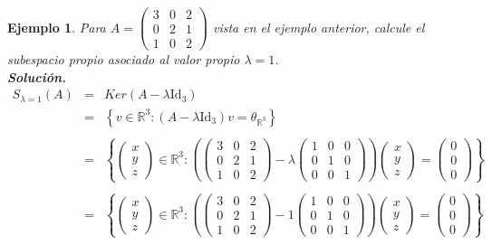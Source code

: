 \documentclass[12pt]{book}
\newtheorem{ejem}{Ejemplo}
\def\R{\mathbb{R}}
\begin{document}
\begin{ejem}
Para $A=\left(\begin{array}{ccc} 3 & 0 & 2 \\ 0 & 2 & 1 \\ 1 & 0 &2  \end{array}\right)$ vista en el ejemplo anterior, calcule el subespacio propio asociado al valor propio $\lambda=1$.\\

\textbf{Soluci\'on.}\\
{\em
\begin{eqnarray*}
S_{\lambda=1}(A)&=&Ker(A-\lambda\text{Id}_3)\\
&=&\left\{ v\in\R^3: (A- \lambda\text{Id}_3)v=\theta_{\R^3}\right\}\\
\\
&=&\left\{ \left(\begin{array}{c} x  \\ y \\ z  \end{array}\right)\in\R^3: \left(\left(\begin{array}{ccc} 3 & 0 & 2 \\ 0 & 2 & 1 \\ 1 & 0 &2  \end{array}\right) - \lambda\left(\begin{array}{ccc} 1 & 0 & 0 \\ 0 & 1 & 0 \\ 0 & 0 & 1 \end{array}\right)\right)\left(\begin{array}{c} x  \\ y \\ z  \end{array}\right)=\left(\begin{array}{c} 0 \\ 0 \\ 0  \end{array}\right)\right\}\\
\\
&=&\left\{ \left(\begin{array}{c} x  \\ y \\ z  \end{array}\right)\in\R^3: \left(\left(\begin{array}{ccc} 3 & 0 & 2 \\ 0 & 2 & 1 \\ 1 & 0 &2  \end{array}\right) - 1\left(\begin{array}{ccc} 1 & 0 & 0 \\ 0 & 1 & 0 \\ 0 & 0 & 1 \end{array}\right)\right)\left(\begin{array}{c} x  \\ y \\ z  \end{array}\right)=\left(\begin{array}{c} 0 \\ 0 \\ 0  \end{array}\right)\right\}\\

\end{eqnarray*}}
\end{ejem}
\end{document}
